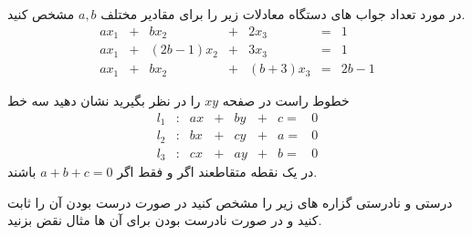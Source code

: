 \documentclass{article}
\begin{document}
در مورد تعداد جواب های دستگاه معادلات زیر را برای مقادیر مختلف 
$a,b$
مشخص کنید.
$$
\begin{array}{ccccccc}
ax_1&+&bx_2&+&2x_3&=&1\\
ax_1&+&(2b-1)x_2&+&3x_3&=&1\\
ax_1&+&bx_2&+&(b+3)x_3&=&2b-1

\end{array}$$

خطوط راست در  صفحه 
$xy$
را در نظر بگیرید نشان دهید سه خط
$$
\begin{array}{cccccccc}
l_1&:&ax&+&by&+&c=&0\\
l_2&:&bx&+&cy&+&a=&0\\
l_3&:&cx&+&ay&+&b=&0
\end{array}$$
در یک نقطه متقاطعند اگر و فقط اگر 
$a+b+c=0$
باشند.

درستی و نادرستی گزاره های زیر را مشخص کنید در صورت درست بودن آن را ثابت کنید و در صورت نادرست بودن برای آن ها مثال نقض بزنید.
\end{document}
